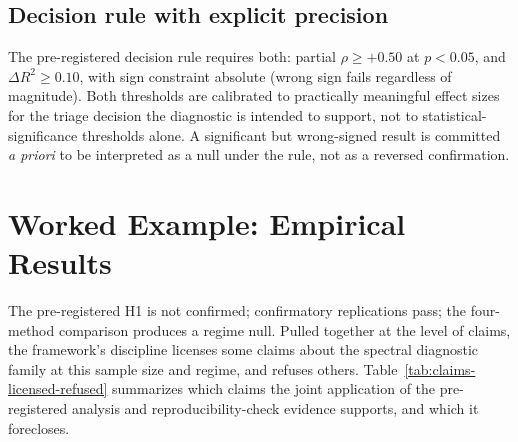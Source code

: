 \documentclass[10pt]{article}
\begin{document}
\subsection{Decision rule with explicit precision}

The pre-registered decision rule requires both: partial $\rho \geq
+0.50$ at $p < 0.05$, and $\Delta R^2 \geq 0.10$, with sign
constraint absolute (wrong sign fails regardless of magnitude).
Both thresholds are calibrated to practically meaningful effect sizes
for the triage decision the diagnostic is intended to support, not
to statistical-significance thresholds alone. A significant but
wrong-signed result is committed \emph{a priori} to be interpreted as
a null under the rule, not as a reversed confirmation.

\section{Worked Example: Empirical Results}
\label{sec:empirical}

The pre-registered H1 is not confirmed; confirmatory replications
pass; the four-method comparison produces a regime null. Pulled
together at the level of claims, the framework's discipline
licenses some claims about the spectral diagnostic family at this
sample size and regime, and refuses others.
Table~\ref{tab:claims-licensed-refused} summarizes which claims
the joint application of the pre-registered analysis and
reproducibility-check evidence supports, and which it forecloses.
\end{document}
